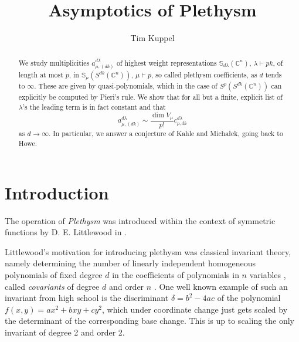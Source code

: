 \documentclass[a4paper]{amsart}
\def\C{{\mathbb{C}}}
\begin{document}
\title{Asymptotics of Plethysm}

\author{Tim Kuppel}
\address{Mathematisches Institut, Universit\"at Bonn, Endenicher Allee 60, Bonn, Germany}


\begin{abstract}We study multiplicities $a^{d\lambda}_{\mu,(dk)}$ of highest weight representations $\mathbb S_{d\lambda}(\C^n)$, $\lambda\vdash pk$, of length at most $p$, in $\mathbb{S}_{\mu}(S^{dk}(\C^n))$, $\mu\vdash p$, so called plethysm coefficients, as $d$ tends to $\infty$.
	These are given by quasi-polynomials, which in the case of $S^p(S^{dk}(\C^n))$ can explicitly be computed by Pieri's rule.
	We show that for all but a finite, explicit list of $\lambda$'s the leading term is in fact constant and that 
	\begin{displaymath}
		a^{d\lambda}_{\mu,(dk)}\sim \frac{\dim V_\mu}{p!}c^{d\lambda}_{p,dk}
	\end{displaymath}
	as $d\to\infty$.
	In particular, we answer a conjecture of Kahle and Micha\l ek, going back to Howe.
\end{abstract}

\maketitle



\section{Introduction}\label{sec1}
The operation of \textit{Plethysm} was introduced within the context of symmetric functions by D. E. Littlewood in \cite{Lit36}.

Littlewood's motivation for introducing plethysm was classical invariant theory, namely determining the number of linearly independent homogeneous polynomials of fixed degree $d$ in the coefficients of polynomials in $n$ variables \cite[p. 305]{Lit44},
called \textit{covariants} of degree $d$ and order $n$ \cite[p. 31]{RK84}.
One well known example of such an invariant from high school is the discriminant $\delta=b^2-4ac$ of the polynomial $f(x,y)=ax^2+bxy+cy^2$, which under coordinate change just gets scaled by the determinant of the corresponding base change. This is up to scaling the only invariant of degree 2 and order 2.
\end{document}

